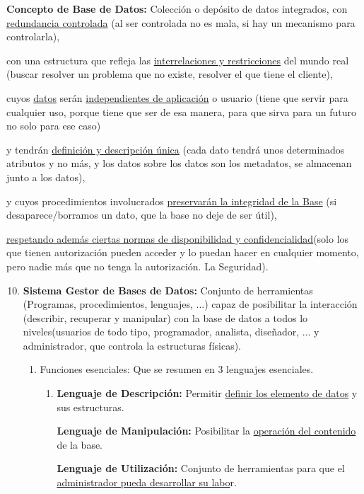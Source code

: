 \documentclass[12pt, twoside, openright]{report} %
\begin{document}
  \textbf{Concepto de Base de Datos:} Colección o depósito de datos
  integrados, con \underline{redundancia controlada} (al ser controlada no es mala, si
hay un mecanismo para controlarla),

con una estructura que refleja las \underline{interrelaciones y
restricciones} del mundo real (buscar resolver un problema que no
existe, resolver el que tiene el cliente),

cuyos \underline{datos} serán \underline{independientes de aplicación} o
usuario (tiene que servir para cualquier uso, porque tiene que ser de
esa manera, para que sirva para un futuro no solo para ese caso)

y tendrán \underline{definición y descripción única} (cada dato tendrá
unos determinados atributos y no más, y los datos sobre los datos son
los metadatos, se almacenan junto a los datos),

y cuyos procedimientos involucrados \underline{preservarán la integridad
de la Base} (si desaparece/borramos un dato, que la base no deje de ser
útil),

\underline{respetando además ciertas normas de disponibilidad y
confidencialidad}(solo los que tienen autorización pueden acceder y lo
puedan hacer en cualquier momento, pero nadie más que no tenga la
autorización. La Seguridad).

\begin{enumerate}
\setcounter{enumi}{9}
\item
  \textbf{Sistema Gestor de Bases de Datos:} Conjunto de herramientas
  (Programas, procedimientos, lenguajes, ...) capaz de posibilitar la
  interacción (describir, recuperar y manipular) con la base de datos a
  todos lo niveles(usuarios de todo tipo, programador, analista,
  diseñador, ... y administrador, que controla la estructuras físicas).

  \begin{enumerate}
  \item Funciones esenciales: Que se resumen en 3 lenguajes esenciales.
    

    \begin{enumerate}
    \item \textbf{Lenguaje de Descripción:} Permitir \underline{definir los
      elemento de datos} y sus estructuras.
      

      
      \textbf{Lenguaje de Manipulación:} Posibilitar la
      \underline{operación del contenido} de la base.
      

      
      \textbf{Lenguaje de Utilización:} Conjunto de herramientas para
      que el \underline{administrador pueda desarrollar su labo}r.
      
    \end{enumerate}
  \end{enumerate}
\end{enumerate}
\end{document}

